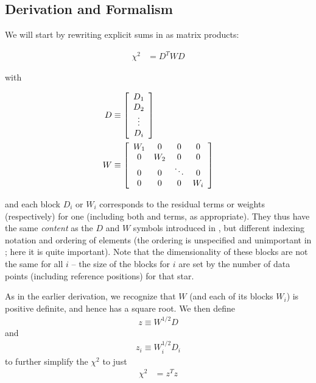 \subsection{Derivation and Formalism}

We will start by rewriting explicit sums in  as matrix products:

\begin{align}
    \chi^{2} & = D^T W D
\end{align}

with

\begin{align}
    D & \equiv \left[
        \begin{array}{ c }
            D_1 \\
            D_2 \\
            \vdots \\
            D_i
        \end{array}
    \right] \\
    W & \equiv \left[
        \begin{array}{ c c c c }
               W_1 & 0 & 0 & 0 \\
            0 &    W_2 & 0 & 0 \\
            0 & 0 & \ddots & 0 \\
            0 & 0 & 0 &    W_i
        \end{array}
    \right]
\end{align}

and each block $D_i$ or $W_i$ corresponds to the residual terms or weights (respectively) for one  (including both  and  terms, as appropriate).
They thus have the same \emph{content} as the $D$ and $W$ symbols introduced in , but different indexing notation and ordering of elements (the ordering is unspecified and unimportant in ; here it is quite important).
Note that the dimensionality of these blocks are not the same for all $i$ -- the size of the blocks for  $i$ are set by the number of data points (including reference positions) for that star.

As in the earlier derivation, we recognize that $W$ (and each of its blocks $W_i$) is positive definite, and hence has a square root.
We then define
\begin{align}
    z \equiv W^{1/2}D
\end{align}
and
\begin{align}
    z_i \equiv W_i^{1/2}D_i
\end{align}
to further simplify the $\chi^2$ to just
\begin{align}
    \chi^{2} & = z^Tz
\end{align}

